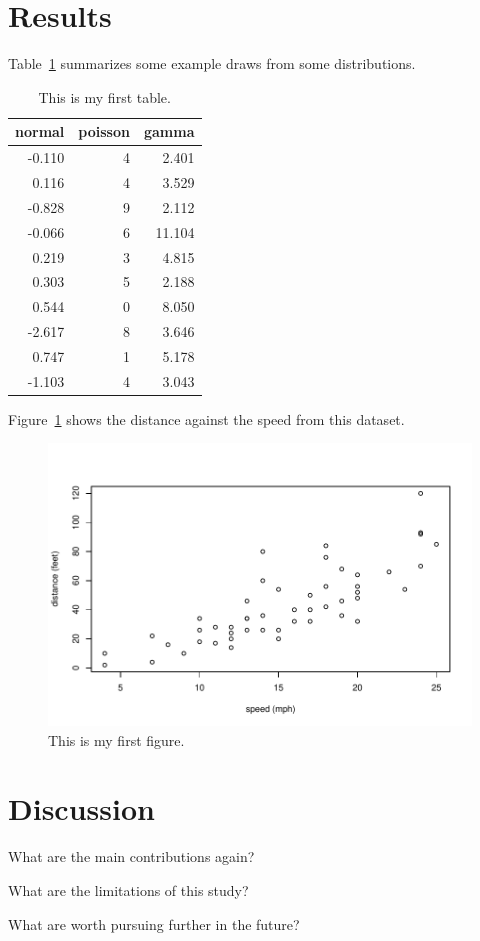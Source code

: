 \documentclass[12pt]{article}
\begin{document}
\section{Results}
\label{sec:resu}

Table~\ref{tab:rv} summarizes some example draws from some distributions.
\lipsum[1-4]

\begin{table}[tbp]
  \caption{This is my first table.}
  \label{tab:rv}
\centering
\begin{tabular}{rrr}
  \hline
normal & poisson & gamma \\ 
  \hline
-0.110 & 4 & 2.401 \\ 
  0.116 & 4 & 3.529 \\ 
  -0.828 & 9 & 2.112 \\ 
  -0.066 & 6 & 11.104 \\ 
  0.219 & 3 & 4.815 \\ 
  0.303 & 5 & 2.188 \\ 
  0.544 & 0 & 8.050 \\ 
  -2.617 & 8 & 3.646 \\ 
  0.747 & 1 & 5.178 \\ 
  -1.103 & 4 & 3.043 \\ 
   \hline
\end{tabular}
\end{table}

Figure~\ref{fig:cars} shows the distance against the speed from this dataset.


\begin{figure}[tbp]
  \centering
  \includegraphics[width=\textwidth]{cars.pdf}
  \caption{This is my first figure.}
  \label{fig:cars}
\end{figure}

\section{Discussion}
\label{sec:disc}

What are the main contributions again?

What are the limitations of this study?

What are worth pursuing further in the future?
\end{document}
